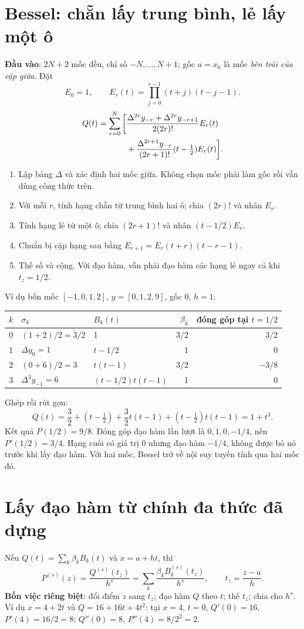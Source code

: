 \section{Bessel: chẵn lấy trung bình, lẻ lấy một ô}
\label{sec:bessel}
\textbf{Đầu vào}: $2N+2$ mốc đều, chỉ số $-N,\ldots,N+1$; gốc $a=x_0$ là mốc \emph{bên trái của cặp giữa}. Đặt
\[
 E_0=1,\qquad E_r(t)=\prod_{j=0}^{r-1}(t+j)(t-j-1).
\]
\begin{align}
 Q(t)=\sum_{r=0}^{N}\bigg[
 &\frac{\Delta^{2r}y_{-r}+\Delta^{2r}y_{-r+1}}{2(2r)!}E_r(t)\notag\\
 &+\frac{\Delta^{2r+1}y_{-r}}{(2r+1)!}(t-\tfrac12)E_r(t)\bigg].
\end{align}
\begin{enumerate}
\item Lập bảng $\Delta$ và xác định hai mốc giữa. Không chọn mốc phải làm gốc rồi vẫn dùng công thức trên.
\item Với mỗi $r$, tính hạng chẵn từ trung bình hai ô; chia $(2r)!$ và nhân $E_r$.
\item Tính hạng lẻ từ một ô; chia $(2r+1)!$ và nhân $(t-1/2)E_r$.
\item Chuẩn bị cặp hạng sau bằng $E_{r+1}=E_r(t+r)(t-r-1)$.
\item Thế số và cộng. Với đạo hàm, vẫn phải đạo hàm các hạng lẻ ngay cả khi $t_z=1/2$.
\end{enumerate}

Ví dụ bốn mốc $[-1,0,1,2]$, $y=[0,1,2,9]$, gốc 0, $h=1$:
\begin{center}\small
\begin{tabular}{@{}rllrr@{}}\toprule
$k$ & $\sigma_k$ & $B_k(t)$ & $\beta_k$ & đóng góp tại $t=1/2$\\\midrule
0 & $(1+2)/2=3/2$ & 1 & $3/2$ & $3/2$\\
1 & $\Delta y_0=1$ & $t-1/2$ & 1 & 0\\
2 & $(0+6)/2=3$ & $t(t-1)$ & $3/2$ & $-3/8$\\
3 & $\Delta^3y_{-1}=6$ & $(t-1/2)t(t-1)$ & 1 & 0\\\bottomrule
\end{tabular}\end{center}
Ghép rồi rút gọn:
\[
 Q(t)=\frac32+(t-\tfrac12)+\frac32t(t-1)+(t-\tfrac12)t(t-1)=1+t^3.
\]
Kết quả $P(1/2)=9/8$. Đóng góp đạo hàm lần lượt là $0,1,0,-1/4$, nên $P'(1/2)=3/4$. Hạng cuối có giá trị 0 nhưng đạo hàm $-1/4$, không được bỏ nó trước khi lấy đạo hàm. Với hai mốc, Bessel trở về nội suy tuyến tính qua hai mốc đó.

\section{Lấy đạo hàm từ chính đa thức đã dựng}
\label{sec:interp-derivative}
Nếu $Q(t)=\sum_k\beta_kB_k(t)$ và $x=a+ht$, thì
\[
 P^{(s)}(z)=\frac{Q^{(s)}(t_z)}{h^s}
          =\sum_k\frac{\beta_kB_k^{(s)}(t_z)}{h^s},\qquad t_z=\frac{z-a}{h}.
\]
\textbf{Bốn việc riêng biệt}: đổi điểm $z$ sang $t_z$; đạo hàm $Q$ theo $t$; thế $t_z$; chia cho $h^s$. Ví dụ $x=4+2t$ và $Q=16+16t+4t^2$: tại $x=4$, $t=0$, $Q'(0)=16$, $P'(4)=16/2=8$; $Q''(0)=8$, $P''(4)=8/2^2=2$.

